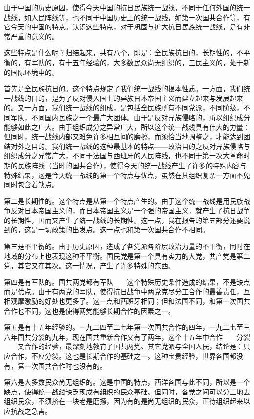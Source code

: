 由于中国的历史原因，使得今天中国的抗日民族统一战线，不同于任何外国的统一战线，如人民阵线等，也不同于中国历史上的统一战线，如第一次国共合作等，有它今天的中国的特点。认识这些特点，对于巩固与扩大抗日民族统一战线，是有非常严重的意义的。

这些特点是什么呢？归结起来，共有八个，即是：全民族抗日的，长期性的，不平衡的，有军队的，有十五年经验的，大多数民众尚无组织的，三民主义的，处于新的国际环境中的。

首先是全民族抗日的。这个特点规定了我们统一战线的根本性质。一方面，我们统一战线的目的，是为了反对侵入国土的异族日本帝国主义而建立起来与发展起来的。又一方面，我们统一战线的组成，是包括全民族所有不同党派，不同阶级，不同军队，不同国内民族之一个最广大团体。由于是反对异族侵略的，所以组织成分能够如此之广大。由于组织成分之异常广大，所以这个统一战线具有伟大的力量：但同时，统一战线内部又难免许多相互间的磨擦，而须恰当地调整之，才能达到团结对外之目的。我们统一战线的这种最基本的特点——政治目的之反对异族侵略与组织成分之异常广大，不同于法国与西班牙的人民阵线，也不同于第一次大革命时期的民族阵线（当时的国共合作），使得今天的统一战线产生了许多的特殊内容与特殊结果，这是今天统一战线的第一个特点与优点，虽然在其组织复杂一方面不免同时包含着缺点。

第二是长期性的。这个特点是从第一个特点产生的。由于这个统一战线是用民族战争反对日本帝国主义的，而日本帝国主义是一个强的帝国主义，就产生了抗日战争的长期性，因而又产生了统一战线的长期性。这一点，我在报告的第五部分还要说到的，这是一切政策的出发点。这一点也和第一次国共合作不相同。

第三是不平衡的。由于历史原因，造成了各党派各阶层政治力量的不平衡，同时在地域的分布上也表现这种不平衡。国民党是第一个具有实力的大党，共产党是第二党，其它又在其次。这一情况，产生了许多特殊的东西。

第四是有军队的。国共两党都有军队——这个特殊历史条件造成的结果，不是缺点而是优点。由于有两党的军队，使得抗日战争中两党克尽分工合作的最善责任，互相观摩激励的好处也更多了。这一点和西班牙相同；但和法国不同，和第一次国共合作也不同，这也是使得两党能够长期合作的因素之一。

第五是有十五年经验的。一九二四至二七年第一次国共合作的四年，一九二七至三六年国共分裂的九年，现在国共重新合作又有了两年，这个十五年中合作——分裂——又合作的经验，最深刻地教育了国共两党、其它党派与全国人民，结论是：只应合作，不应分裂。这也是长期合作的基础之一。这种宝贵经验，世界各国都没有，第一次国共合作时也没有的。

第六是大多数民众尚无组织的。这是中国的特点，西洋各国与此不同，所以是一个缺点，使得统一战线缺乏现成有组织的民众基础。但同时，各党之间可以分工地去组织民众，不须挤在一块老是磨擦，因为有的是尚无组织的民众，正待组织起来以应抗战之急需。

